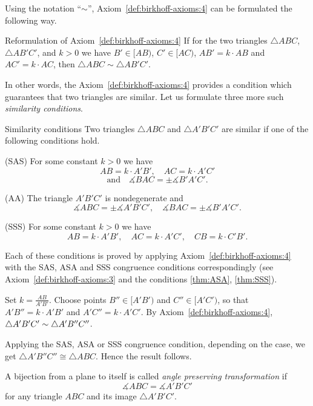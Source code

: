 Using the notation ``$\sim$'', Axiom~\ref{def:birkhoff-axioms:4} can be formulated the following way.

\begin{thm}{Reformulation of Axiom~\ref{def:birkhoff-axioms:4}}
If for the two triangles 
$\triangle ABC$, 
$\triangle AB'C'$,
and $k>0$ we have
$B'\in [AB)$,
$C'\in [AC)$,
$AB'=k\cdot AB$ and
$AC'=k\cdot AC$,
then $\triangle ABC\sim\triangle AB'C'$.
\end{thm}

In other words, the Axiom~\ref{def:birkhoff-axioms:4} provides 
a condition which guarantees that two triangles are similar.
Let us formulate three more such {}\emph{similarity conditions}.

\begin{thm}{Similarity conditions}\label{prop:sim}
Two triangles 
$\triangle ABC$ and $\triangle A'B'C'$
are similar if one of the following conditions hold.

(SAS) For some constant $k>0$ we have
$$A B=k\cdot A' B',
\quad  
A C=k\cdot A' C'$$
$$
\text{and}
\quad 
\measuredangle B A C=\pm\measuredangle B' A' C'.$$

(AA) The triangle $A' B' C'$ is nondegenerate
and 
$$\measuredangle  A B  C
=
\pm\measuredangle A' B' C',
\quad 
\measuredangle B A C
=
\pm\measuredangle B' A' C'.$$

(SSS) For some constant $k>0$ we have
$$A B=k\cdot A' B',
\quad
A C=k\cdot A' C',
\quad
CB=k\cdot C'B'.$$

\end{thm}

Each of these conditions is proved by applying Axiom~\ref{def:birkhoff-axioms:4} with the SAS, ASA and SSS congruence conditions correspondingly
(see Axiom~\ref{def:birkhoff-axioms:3} and the conditions \ref{thm:ASA}, \ref{thm:SSS}).


Set $k=\tfrac{AB}{A'B'}$.
Choose points $B''\in [A'B')$ and $C''\in [A'C')$,
so that $A'B''=k\cdot A'B'$ and $A'C''=k\cdot A'C'$.
By Axiom~\ref{def:birkhoff-axioms:4},
$\triangle A'B'C'\z\sim \triangle A'B''C''$.

Applying the SAS, ASA or SSS congruence condition, depending on the case, 
we get $\triangle A'B''C''\cong \triangle ABC$.
Hence the result follows.
\qeds



A bijection from a plane to itself is called \emph{angle preserving transformation} if 
\[\measuredangle ABC= \measuredangle A'B'C'\]
for any triangle $ABC$ and its image $\triangle A'B'C'$.


